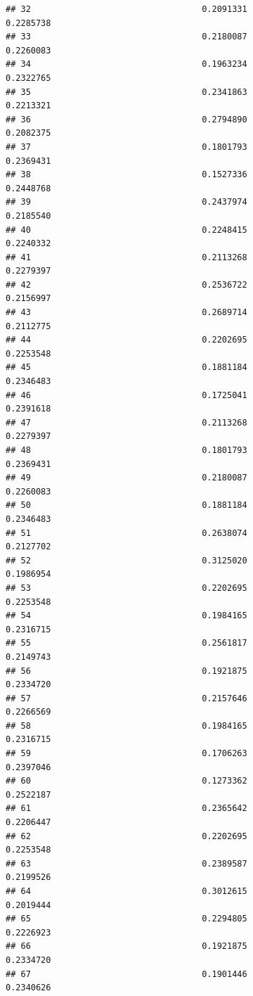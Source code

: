 \documentclass[
  american,
  man,floatsintext]{apa7}
\begin{document}
\begin{verbatim}
## 32                                  0.2091331               0.2285738
## 33                                  0.2180087               0.2260083
## 34                                  0.1963234               0.2322765
## 35                                  0.2341863               0.2213321
## 36                                  0.2794890               0.2082375
## 37                                  0.1801793               0.2369431
## 38                                  0.1527336               0.2448768
## 39                                  0.2437974               0.2185540
## 40                                  0.2248415               0.2240332
## 41                                  0.2113268               0.2279397
## 42                                  0.2536722               0.2156997
## 43                                  0.2689714               0.2112775
## 44                                  0.2202695               0.2253548
## 45                                  0.1881184               0.2346483
## 46                                  0.1725041               0.2391618
## 47                                  0.2113268               0.2279397
## 48                                  0.1801793               0.2369431
## 49                                  0.2180087               0.2260083
## 50                                  0.1881184               0.2346483
## 51                                  0.2638074               0.2127702
## 52                                  0.3125020               0.1986954
## 53                                  0.2202695               0.2253548
## 54                                  0.1984165               0.2316715
## 55                                  0.2561817               0.2149743
## 56                                  0.1921875               0.2334720
## 57                                  0.2157646               0.2266569
## 58                                  0.1984165               0.2316715
## 59                                  0.1706263               0.2397046
## 60                                  0.1273362               0.2522187
## 61                                  0.2365642               0.2206447
## 62                                  0.2202695               0.2253548
## 63                                  0.2389587               0.2199526
## 64                                  0.3012615               0.2019444
## 65                                  0.2294805               0.2226923
## 66                                  0.1921875               0.2334720
## 67                                  0.1901446               0.2340626

\end{verbatim}
\end{document}
